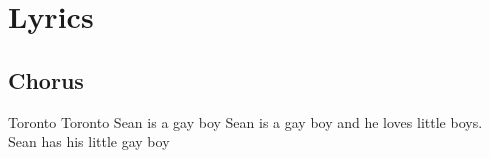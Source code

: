 \documentclass{article}
\begin{document}
\section*{Lyrics}
\subsection*{Chorus}
Toronto Toronto Sean is a gay boy Sean is a gay boy and he loves little boys. Sean has his little gay boy 
\end{document}
